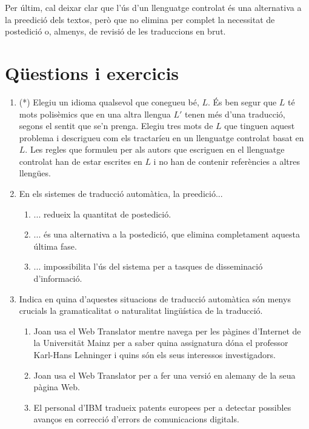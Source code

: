 Per últim, cal deixar clar que l'ús d'un llenguatge controlat és una
alternativa a la preedició dels textos, però que no elimina per
complet la necessitat de postedició o, almenys, de revisió de les
traduccions en brut.

\section{Qüestions i exercicis}
\begin{enumerate}
\item(*) Elegiu un idioma qualsevol que conegueu bé, $L$. És ben segur
  que $L$ té mots polisèmics que en una altra llengua $L'$ tenen més
  d'una traducció, segons el sentit que se'n prenga. Elegiu tres mots
  de $L$ que tinguen aquest problema i descrigueu com els tractaríeu
  en un llenguatge controlat basat en $L$. Les regles que formuleu per
  als autors que escriguen en el llenguatge controlat han de estar
  escrites en $L$ i no han de contenir referències a altres llengües.

\item En els sistemes de traducció automàtica, la preedició...
  \begin{enumerate}
  \item ... redueix la quantitat de postedició.
  \item ... és una alternativa a la postedició, que elimina
    completament aquesta última fase.
  \item ... impossibilita l'ús del sistema per a tasques de
    disseminació d'informació.
 \end{enumerate}

\item Indica en quina d'aquestes situacions de traducció automàtica
  són menys crucials la gramaticalitat o naturalitat lingüística de la
  traducció.
  \begin{enumerate}
  \item Joan usa el Web Translator mentre navega per les pàgines
    d'Internet de la Universität Mainz per a saber quina assignatura
    dóna el professor Karl-Hans Lehninger i quins són els seus
    interessos investigadors.
  \item Joan usa el Web Translator per a fer una versió en alemany de
    la seua pàgina Web.
  \item El personal d'IBM tradueix patents europees per a detectar
    possibles avanços en correcció d'errors de comunicacions digitals.
  \end{enumerate}


\end{enumerate}
